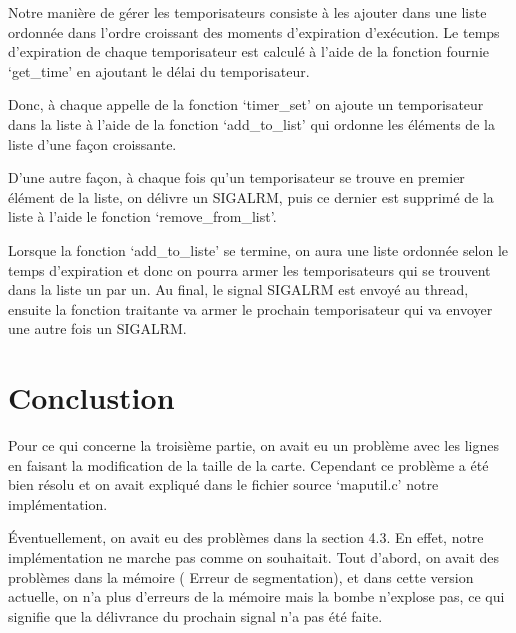\documentclass{article}
\begin{document}
Notre manière de gérer les temporisateurs consiste à les ajouter dans une liste ordonnée dans l’ordre croissant des moments d’expiration d’exécution. Le temps d’expiration de chaque temporisateur est calculé à l’aide de la fonction fournie ‘get\_time’ en ajoutant le délai du temporisateur.

Donc, à chaque appelle de la fonction ‘timer\_set’ on ajoute un temporisateur dans la liste à l’aide de la fonction ‘add\_to\_list’ qui ordonne les éléments de la liste d’une façon croissante. 

D’une autre façon, à chaque fois qu’un temporisateur se trouve en premier élément de la liste, on délivre un SIGALRM, puis ce dernier est supprimé de la liste à l’aide le fonction ‘remove\_from\_list’.

Lorsque la fonction ‘add\_to\_liste’ se termine, on aura une liste ordonnée selon le temps d’expiration et donc on pourra armer les temporisateurs qui se trouvent dans la liste un par un. 
Au final, le signal SIGALRM est envoyé au thread, ensuite la fonction traitante va armer le prochain temporisateur qui va envoyer une autre fois un SIGALRM.

\section{Conclustion}
Pour ce qui concerne la troisième partie, on avait eu un problème avec les lignes en faisant la modification de la taille de la carte. Cependant ce problème a été bien résolu et on avait expliqué dans le fichier source ‘maputil.c’ notre implémentation.

Éventuellement, on avait eu des problèmes dans la section 4.3. En effet, notre implémentation ne marche pas comme on souhaitait. Tout d’abord, on avait des problèmes dans la mémoire ( Erreur de segmentation), et dans cette version actuelle, on n’a plus d’erreurs de la mémoire mais la bombe n’explose pas, ce qui signifie que la délivrance du prochain signal n’a pas été faite.    
 
\end{document}
